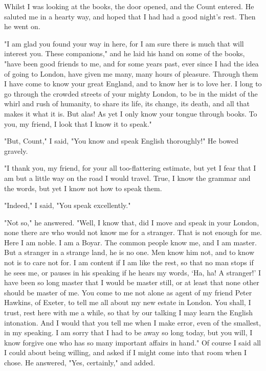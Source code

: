 Whilst I was looking at the books, the door opened, and the Count entered. He saluted me in a hearty way, and hoped that I had had a good night's rest. Then he went on. 

"I am glad you found your way in here, for I am sure there is much that will interest you. These companions," and he laid his hand on some of the books, "have been good friends to me, and for some years past, ever since I had the idea of going to London, have given me many, many hours of pleasure. Through them I have come to know your great England, and to know her is to love her. I long to go through the crowded streets of your mighty London, to be in the midst of the whirl and rush of humanity, to share its life, its change, its death, and all that makes it what it is. But alas! As yet I only know your tongue through books. To you, my friend, I look that I know it to speak." 

"But, Count," I said, "You know and speak English thoroughly!" He bowed gravely. 

"I thank you, my friend, for your all too-flattering estimate, but yet I fear that I am but a little way on the road I would travel. True, I know the grammar and the words, but yet I know not how to speak them. 

"Indeed," I said, "You speak excellently." 

"Not so," he answered. "Well, I know that, did I move and speak in your London, none there are who would not know me for a stranger. That is not enough for me. Here I am noble. I am a Boyar. The common people know me, and I am master. But a stranger in a strange land, he is no one. Men know him not, and to know not is to care not for. I am content if I am like the rest, so that no man stops if he sees me, or pauses in his speaking if he hears my words, `Ha, ha! A stranger!' I have been so long master that I would be master still, or at least that none other should be master of me. You come to me not alone as agent of my friend Peter Hawkins, of Exeter, to tell me all about my new estate in London. You shall, I trust, rest here with me a while, so that by our talking I may learn the English intonation. And I would that you tell me when I make error, even of the smallest, in my speaking. I am sorry that I had to be away so long today, but you will, I know forgive one who has so many important affairs in hand." Of course I said all I could about being willing, and asked if I might come into that room when I chose. He answered, "Yes, certainly," and added. 


